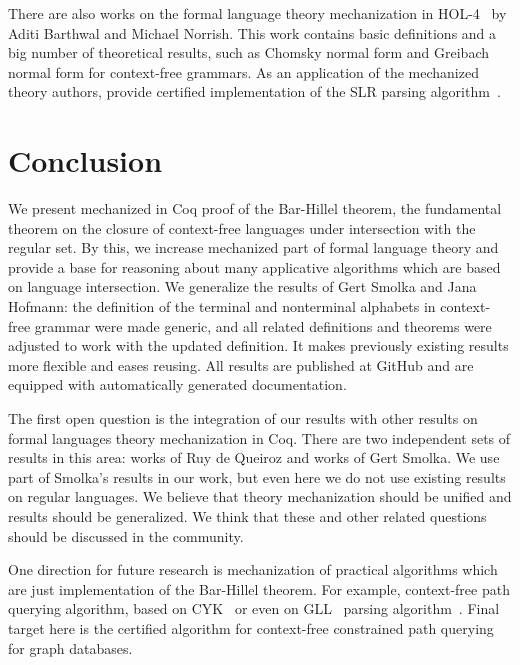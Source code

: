 \documentclass[runningheads]{llncs}
\begin{document}
There are also works on the formal language theory mechanization in HOL-4~\cite{1885-16399,barthwal2010formalisation,10.1007/978-3-642-13824-9_11} by Aditi Barthwal and Michael Norrish.
This work contains basic definitions and a big number of theoretical results, such as Chomsky normal form and Greibach normal form for context-free grammars.
As an application of the mechanized theory authors, provide certified implementation of the SLR parsing algorithm~\cite{10.1007/978-3-642-00590-9_12}.

\section{Conclusion}
\label{sec:conclusion}

We present mechanized in Coq proof of the Bar-Hillel theorem, the fundamental theorem on the closure of context-free languages under intersection with the regular set.
By this, we increase mechanized part of formal language theory and provide a base for reasoning about many applicative algorithms which are based on language intersection.
We generalize the results of Gert Smolka and Jana Hofmann: the definition of the terminal and nonterminal alphabets in context-free grammar were made generic, and all related definitions and theorems were adjusted to work with the updated definition.
It makes previously existing results more flexible and eases reusing.
All results are published at GitHub and are equipped with automatically generated documentation.

The first open question is the integration of our results with other results on formal languages theory mechanization in Coq.
There are two independent sets of results in this area: works of Ruy de Queiroz and works of Gert Smolka.
We use part of Smolka's results in our work, but even here we do not use existing results on regular languages.
We believe that theory mechanization should be unified and results should be generalized.
We think that these and other related questions should be discussed in the community.

One direction for future research is mechanization of practical algorithms which are just implementation of the Bar-Hillel theorem.
For example, context-free path querying algorithm, based on CYK~\cite{hellingsPathQuerying,zhang2016context} or even on GLL~\cite{scott2010gll} parsing algorithm~\cite{grigorev2016context}.
Final target here is the certified algorithm for context-free constrained path querying for graph databases.
\end{document}
